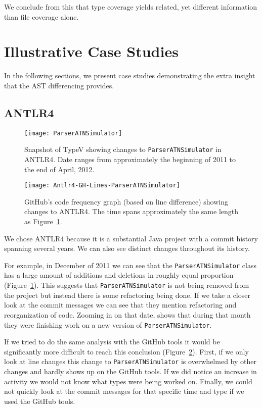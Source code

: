 We conclude from this that type coverage yields related, yet different information than file coverage alone.

\section{Illustrative Case Studies}

In the following sections, we present case studies demonstrating the extra insight that the AST differencing provides.

\subsection{ANTLR4}\label{sec:antlr4}

\begin{figure}[!ht]
\centering
\texttt{[image: ParserATNSimulator]}
\caption{Snapshot of TypeV showing changes to \texttt{ParserATNSimulator} in ANTLR4. Date ranges from approximately the beginning of 2011 to the end of April, 2012.}
\label{fig:parser1}
\end{figure}

\begin{figure}[!ht]
\centering
\texttt{[image: Antlr4-GH-Lines-ParserATNSimulator]}
\caption{GitHub's code frequency graph (based on line difference) showing changes to ANTLR4. The time spans approximately the same length as Figure~\ref{fig:parser1}.}
\label{fig:parser2}
\end{figure}

We chose ANTLR4 because it is a substantial Java project with a commit history spanning several years. We can also see distinct changes throughout its history.

For example, in December of 2011 we can see that the \texttt{ParserATNSimulator} class has a large amount of additions and deletions in roughly equal proportion (Figure~\ref{fig:parser1}). This suggests that \texttt{ParserATNSimulator} is not being removed from the project but instead there is some refactoring being done. If we take a closer look at the commit messages we can see that they mention refactoring and reorganization of code. Zooming in on that date,  shows that during that month they were finishing work on a new version of \texttt{ParserATNSimulator}.

If we tried to do the same analysis with the GitHub tools it would be significantly more difficult to reach this conclusion (Figure~\ref{fig:parser2}). First, if we only look at line changes this change to \texttt{ParserATNSimulator} is overwhelmed by other changes and hardly shows up on the GitHub tools. If we did notice an increase in activity we would not know what types were being worked on. Finally, we could not quickly look at the commit messages for that specific time and type if we used the GitHub tools.

